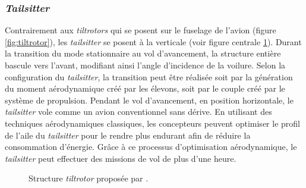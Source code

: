         \subsubsection*{\textit{Tailsitter}}
        Contrairement aux \textit{tiltrotors} qui se posent sur le fuselage de l'avion (figure \ref{fig:tiltrotor}), les \textit{tailsitter} se posent à la verticale (voir figure centrale \ref{fig:tailsitter}). Durant la transition du mode stationnaire au vol d'avancement, la structure entière bascule vers l'avant, modifiant ainsi l'angle d'incidence de la voilure. Selon la configuration du \textit{tailsitter}, la transition peut être réalisée soit par la génération du moment aérodynamique créé par les élevons, soit par le couple créé par le système de propulsion. Pendant le vol d'avancement, en position horizontale, le \textit{tailsitter} vole comme un avion conventionnel sans dérive. En utilisant des techniques aérodynamiques classiques, les concepteurs peuvent optimiser le profil de l'aile du \textit{tailsitter} pour le rendre plus endurant afin de réduire la consommation d'énergie. Grâce à ce processus d'optimisation aérodynamique, le \textit{tailsitter} peut effectuer des missions de vol de plus d'une heure.

        \begin{figure}[ht!]
            \centering
            \caption{Structure \textit{tiltrotor}  proposée par \cite{smeurINDITail,fernandez:hal-04612206,pflimlin:tel-00132352}.}
            \label{fig:tailsitter}
        \end{figure}
        
